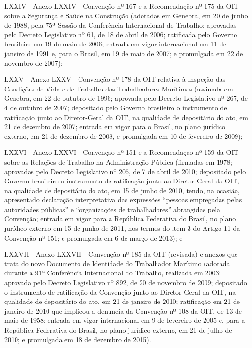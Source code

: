 \documentclass[
]{book}
\begin{document}
LXXIV - Anexo LXXIV - Convenção nº 167 e a Recomendação nº 175 da OIT sobre a Segurança e Saúde na Construção (adotadas em Genebra, em 20 de junho de 1988, pela 75ª Sessão da Conferência Internacional do Trabalho; aprovadas pelo Decreto Legislativo nº 61, de 18 de abril de 2006; ratificada pelo Governo brasileiro em 19 de maio de 2006; entrada em vigor internacional em 11 de janeiro de 1991 e, para o Brasil, em 19 de maio de 2007; e promulgada em 22 de novembro de 2007);

LXXV - Anexo LXXV - Convenção nº 178 da OIT relativa à Inspeção das Condições de Vida e de Trabalho dos Trabalhadores Marítimos (assinada em Genebra, em 22 de outubro de 1996; aprovada pelo Decreto Legislativo nº 267, de 4 de outubro de 2007; depositado pelo Governo brasileiro o instrumento de ratificação junto ao Diretor-Geral da OIT, na qualidade de depositário do ato, em 21 de dezembro de 2007; entrada em vigor para o Brasil, no plano jurídico externo, em 21 de dezembro de 2008, e promulgada em 10 de fevereiro de 2009);

LXXVI - Anexo LXXVI - Convenção nº 151 e a Recomendação nº 159 da OIT sobre as Relações de Trabalho na Administração Pública (firmadas em 1978; aprovadas pelo Decreto Legislativo nº 206, de 7 de abril de 2010; depositado pelo Governo brasileiro o instrumento de ratificação junto ao Diretor-Geral da OIT, na qualidade de depositário do ato, em 15 de junho de 2010, tendo, na ocasião, apresentado declaração interpretativa das expressões ``pessoas empregadas pelas autoridades públicas'' e ``organizações de trabalhadores'' abrangidas pela Convenção; entrada em vigor para a República Federativa do Brasil, no plano jurídico externo em 15 de junho de 2011, nos termos do item 3 do Artigo 11 da Convenção nº 151; e promulgada em 6 de março de 2013); e

LXXVII - Anexo LXXVII - Convenção nº 185 da OIT (revisada) e anexos que trata do novo Documento de Identidade do Trabalhador Marítimo (adotada durante a 91ª Conferência Internacional do Trabalho, realizada em 2003; aprovada pelo Decreto Legislativo nº 892, de 20 de novembro de 2009; depositado o instrumento de ratificação da Convenção junto ao Diretor-Geral da OIT, na qualidade de depositário do ato, em 21 de janeiro de 2010; ratificação em 21 de janeiro de 2010 que implicou a denúncia da Convenção nº 108 da OIT, de 13 de maio de 1958; entrada em vigor internacional em 9 de fevereiro de 2005 e, para a República Federativa do Brasil, no plano jurídico externo, em 21 de julho de 2010; e promulgada em 18 de dezembro de 2015).
\end{document}
